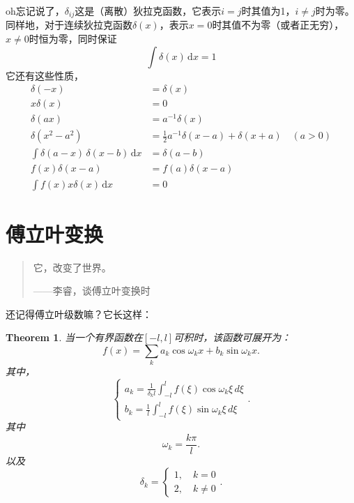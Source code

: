 \documentclass[12pt,a4paper,openany,twoside]{book}
\newtheorem{theorem}{Theorem}[section]
\numberwithin{equation}{section}
\newcommand{\ud}{\mathrm{d}}
\begin{document}
          oh忘记说了，$\delta_{ij}$这是（离散）狄拉克函数，它表示$i=j$时其值为1，$i\neq j$时为零。同样地，对于连续狄拉克函数$\delta(x)$，表示$x=0$时其值不为零（或者正无穷），$x\neq 0$时恒为零，同时保证
          \begin{equation}
            \int \delta(x) \, \ud x = 1 
          \end{equation}
          它还有这些性质，
          \begin{align}
            \delta(-x) & = \delta(x) \\
            x\delta(x) & = 0 \\
            \delta(a x) & = a^{-1} \delta(x)\\
            \delta(x^2-a^2) & = \frac{1}{2} a^{-1} {\delta(x-a)+\delta(x+a)} \quad (a>0)\\
            \int \delta(a-x) \, \delta(x-b) \, \ud x & = \delta(a-b) \\
            f(x) \delta(x-a) &=  f(a)\delta(x-a)\\
            \int f(x)x\delta(x) \, \ud x & = 0
          \end{align}

      \section{傅立叶变换}
        \begin{quote}
          它，改变了世界。
          \begin{flushright}
            ——李睿，谈傅立叶变换时
          \end{flushright}
        \end{quote}     
        还记得傅立叶级数嘛？它长这样：
        \begin{theorem}
          当一个有界函数在$[-l,l]$可积时，该函数可展开为：
          \begin{equation}
            f(x) = \sum_k a_k \cos{\omega_k x} + b_k \sin{\omega_k x}.
          \end{equation}
          其中，
          \begin{equation} 
            \begin{cases}
              a_k = \frac{1}{\delta_k l}\int _{-l} ^l f(\xi) \cos{\omega_k} \xi \, d\xi \\
              b_k =  \frac{1}{l} \int _{-l} ^l f(\xi) \sin{\omega_k \xi} \, d\xi 
            \end{cases}
            .
          \end{equation}
          其中
          \begin{equation}
            \omega_k = \frac{k \pi}{l}.
          \end{equation}
          以及
          \begin{equation}
            \delta_k =
            \begin{cases}
              1, \quad k = 0 \\
              2, \quad k \neq 0 
            \end{cases}
            .
          \end{equation}
        \end{theorem}
\end{document}
